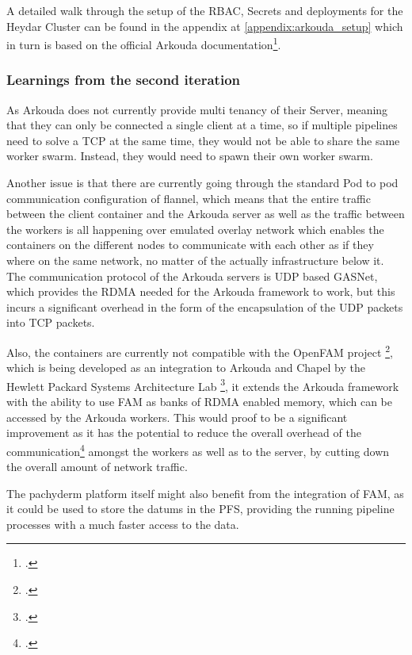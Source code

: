 A detailed walk through the setup of the \ac{RBAC}, Secrets and deployments for the Heydar Cluster can be found in the appendix at \ref{appendix:arkouda_setup} which in turn is based on the official
Arkouda documentation\footcite{ArkoudacontribArkoudadockerMain}.

\subsubsection*{Learnings from the second iteration}
As Arkouda does not currently provide multi tenancy of their Server, meaning that they can only be connected a single client at a time, 
so if multiple pipelines need to solve a \ac{TCP} at the same time, they would not be able to share the same worker swarm.
Instead, they would need to spawn their own worker swarm.

Another issue is that there are currently going through the standard Pod to pod communication configuration of flannel, which means that the entire traffic between the client container and the Arkouda server 
as well as the traffic between the workers is all happening over emulated overlay network which enables the containers on the different nodes to communicate with each other as if they where on the same network, no matter of the actually infrastructure below it.
The communication protocol of the Arkouda servers is \ac{UDP} based \ac{GASNet}, which provides the \ac{RDMA} needed for the Arkouda framework to work, but this incurs a significant overhead in the form of the encapsulation of the \ac{UDP} packets into \ac{TCP} packets.

Also, the containers are currently not compatible with the OpenFAM project \footcite{keetonOpenFAMAPIProgramming2019}, which is being developed as an integration to Arkouda and Chapel by the Hewlett Packard Systems Architecture Lab \footcite{byrneCouplingChapelPoweredHPC2023},
it extends the Arkouda framework with the ability to use \ac{FAM} as banks of \ac{RDMA} enabled memory, which can be accessed by the Arkouda workers.
This would proof to be a significant improvement as it has the potential to reduce the overall overhead of the communication\Footcite{chouOptimizingPostCopyLive2019} amongst the workers as well as to the server, by cutting down the overall amount of network traffic.

The pachyderm platform itself might also benefit from the integration of \ac{FAM}, as it could be used to store the datums in the \ac{PFS}, providing the running pipeline processes with a much faster access to the data.

